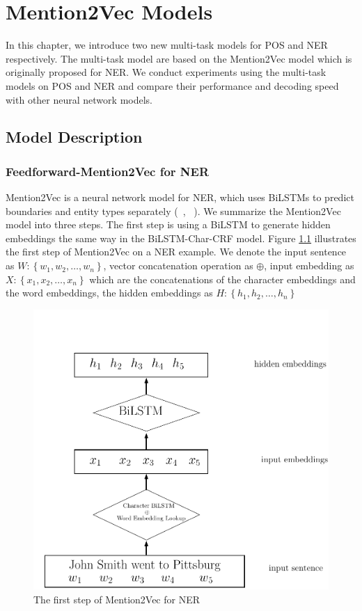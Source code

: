 \chapter{Mention2Vec Models}

In this chapter, we introduce two new multi-task models for POS and NER respectively. The multi-task model are based on the Mention2Vec model which is originally proposed for NER. We conduct experiments using the multi-task models on POS and NER and compare their performance and decoding speed with other neural network models.

\section{Model Description}

\subsection{Feedforward-Mention2Vec for NER}

Mention2Vec is a neural network model for NER, which uses BiLSTMs to predict boundaries and entity types separately (~\citeauthor{stratos2016mention2vec}, ~\citeyear{stratos2016mention2vec}). We summarize the Mention2Vec model into three steps. The first step is using a BiLSTM to generate hidden embeddings the same way in the BiLSTM-Char-CRF model. Figure \ref{fig:mention2vec1} illustrates the first step of Mention2Vec on a NER example. We denote the input sentence as $W: \left\{w_{1}, w_{2}, \dots, w_{n}\right\}$, vector concatenation operation as $\oplus$, input embedding as $X: \left\{x_{1}, x_{2}, \dots, x_{n}\right\}$ which are the concatenations of the character embeddings and the word embeddings, the hidden embeddings as $H: \left\{h_{1}, h_{2}, \dots, h_{n}\right\}$

\begin{figure}
  \centering
  \includegraphics[scale=0.6]{mention2vec1.pdf}
 \caption{The first step of Mention2Vec for NER}
  \label{fig:mention2vec1}
\end{figure}

